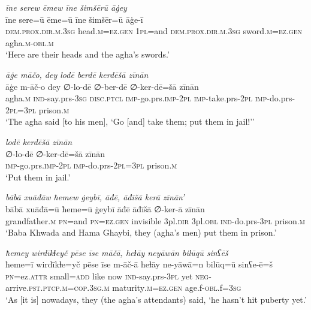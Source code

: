 \ea \label{BP.128}
\textit{īne serew ēmew īne šimšērū āġey} \\ 
\gll īne sere=ū ēme=ū īne šimšēr=ū āġe-ī \\ 
 \textsc{dem.prox}\textsc{.dir}\textsc{.m}\textsc{.3sg} head\textsc{.m}\textsc{=ez.gen} \textsc{1pl}=and \textsc{dem.prox}\textsc{.dir}\textsc{.m}\textsc{.3sg} sword\textsc{.m}\textsc{=ez.gen} agha\textsc{.m}\textsc{-obl}\textsc{.m} \\ 
\glt `Here are their heads and the agha’s swords.'
\z 
 
\ea \label{BP.129}
\textit{āġe māčo, dey lodē berdē kerdēšā zīnān} \\ 
\gll āġe m-āč-o dey ∅-lo-dē ∅-ber-dē ∅-ker-dē=šā zīnān \\ 
 agha\textsc{.m} \textsc{ind-}say.prs\textsc{-3sg} \textsc{disc.ptcl} \textsc{imp-}go.prs.\textsc{imp-}\textsc{2pl} \textsc{imp-}take.prs-\textsc{2pl} \textsc{imp-}do.prs-\textsc{2pl}\textsc{=3pl} prison\textsc{.m} \\ 
\glt `The agha said [to his men], ‘Go [and] take them; put them in jail!’'
\z 
 
\ea \label{BP.130}
\textit{lodē kerdēšā zīnān} \\ 
\gll ∅-lo-dē ∅-ker-dē=šā zīnān \\ 
 \textsc{imp-}go.prs.\textsc{imp-}\textsc{2pl} \textsc{imp-}do.prs-\textsc{2pl}\textsc{=3pl} prison\textsc{.m} \\ 
\glt `Put them in jail.'
\z 
 
\ea \label{BP.131}
\textit{bābā xuāđāw ħemew ġeybī, āđē, āđīšā kerā zīnān’} \\ 
\gll bābā xuāđā=ū ħeme=ū ġeybī āđē āđīšā ∅-ker-ā zīnān \\ 
 grandfather\textsc{.m} \textsc{pn}=and \textsc{pn}\textsc{=ez.gen} invisible 3pl\textsc{.dir} 3pl\textsc{.obl} \textsc{ind-}do.prs\textsc{-3pl} prison\textsc{.m} \\ 
\glt `Baba Khwada and Hama Ghaybi, they (agha’s men) put them  in prison.'
\z 
 
\ea \label{BP.132}
\textit{ħemey wirdīkɫeyč pēse īse māčā, heɫāy neyāwān bilūqū sinʕēš} \\ 
\gll ħeme=ī wirdīkɫe=yč pēse īse m-āč-ā heɫāy ne-yāwā=n bilūq=ū sinʕe-ē=š \\ 
 \textsc{pn}=ez.\textsc{attr} small\textsc{=add} like now \textsc{ind-}say.prs\textsc{-3pl} yet \textsc{neg-}arrive\textsc{.pst}\textsc{.ptcp}\textsc{.m}\textsc{=cop}\textsc{.3sg}\textsc{.m} maturity\textsc{.m}\textsc{=ez.gen} age.f\textsc{-obl}.f\textsc{=3sg} \\ 
\glt `As [it is] nowadays, they (the agha’s attendants) said, ‘he hasn’t hit puberty yet.'
\z 
 
